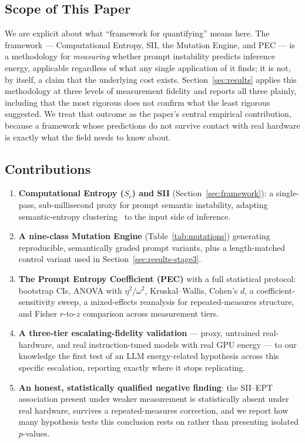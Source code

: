 \documentclass[conference]{IEEEtran}
\begin{document}
\subsection{Scope of This Paper}
\label{sec:scope}
We are explicit about what ``framework for quantifying'' means here.
The framework --- Computational Entropy, SII, the Mutation Engine, and
PEC --- is a methodology for \emph{measuring} whether prompt
instability predicts inference energy, applicable regardless of what
any single application of it finds; it is not, by itself, a claim that
the underlying cost exists. Section~\ref{sec:results} applies this
methodology at three levels of measurement fidelity and reports all
three plainly, including that the most rigorous does not confirm what
the least rigorous suggested. We treat that outcome as the paper's
central empirical contribution, because a framework whose predictions
do not survive contact with real hardware is exactly what the field
needs to know about.
\subsection{Contributions}
\begin{enumerate}
\item \textbf{Computational Entropy ($S_c$) and SII}
(Section~\ref{sec:framework}): a single-pass, sub-millisecond proxy for
prompt semantic instability, adapting semantic-entropy
clustering~\cite{kuhn2023semantic} to the input side of inference.
\item \textbf{A nine-class Mutation Engine} (Table~\ref{tab:mutations})
generating reproducible, semantically graded prompt variants, plus a
length-matched control variant used in Section~\ref{sec:results-stage3}.
\item \textbf{The Prompt Entropy Coefficient (PEC)} with a full
statistical protocol: bootstrap CIs, ANOVA with $\eta^2/\omega^2$,
Kruskal--Wallis, Cohen's $d$, a coefficient-sensitivity sweep, a
mixed-effects reanalysis for repeated-measures structure, and Fisher
$r$-to-$z$ comparison across measurement tiers.
\item \textbf{A three-tier escalating-fidelity validation} --- proxy,
untrained real-hardware, and real instruction-tuned models with real
GPU energy --- to our knowledge the first test of an LLM
energy-related hypothesis across this specific escalation, reporting
exactly where it stops replicating.
\item \textbf{An honest, statistically qualified negative finding}:
the SII--EPT association present under weaker measurement is
statistically absent under real hardware, survives a repeated-measures
correction, and we report how many hypothesis tests this conclusion
rests on rather than presenting isolated $p$-values.
\end{enumerate}
\end{document}
